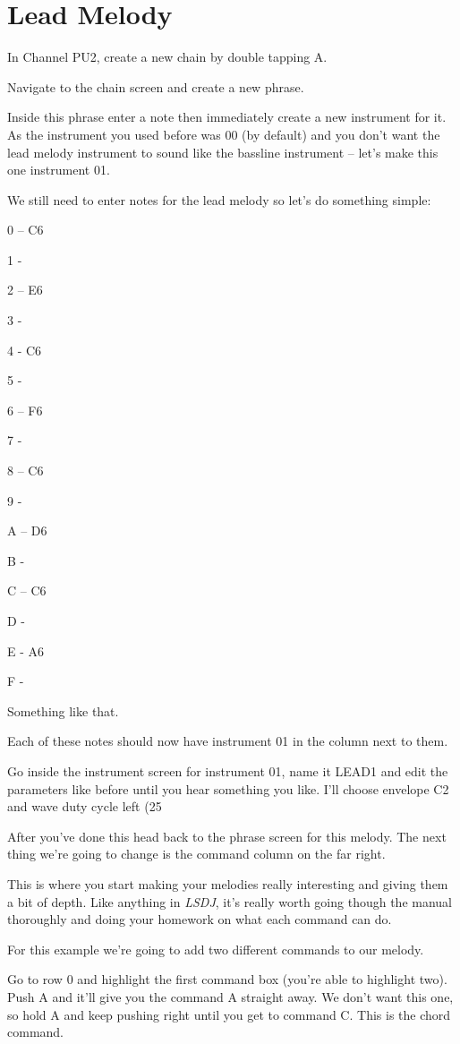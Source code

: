 \documentclass[]{article}
\newcommand{\lsdj}{\textit{LSDJ}\xspace}
\begin{document}
\section{Lead Melody}

In Channel PU2, create a new chain by double tapping A.

Navigate to the chain screen and create a new phrase.

Inside this phrase enter a note then immediately create a new instrument for it. As the instrument you used before was 00 (by default) and you don't want the lead melody instrument to sound like the bassline instrument – let's make this one instrument 01.

We still need to enter notes for the lead melody so let's do something simple:

0 – C6

1 -

2 – E6

3 -

4 - C6

5 -

6 – F6

7 -

8 – C6

9 -

A – D6

B -

C – C6

D -

E - A6

F -


Something like that.

Each of these notes should now have instrument 01 in the column next to them.

Go inside the instrument screen for instrument 01, name it LEAD1 and edit the parameters like before until you hear something you like. I'll choose envelope C2 and wave duty cycle left (25%

After you've done this head back to the phrase screen for this melody. The next thing we're going to change is the command column on the far right.

This is where you start making your melodies really interesting and giving them a bit of depth. Like anything in \lsdj, it's really worth going though the manual thoroughly and doing your homework on what each command can do.

For this example we're going to add two different commands to our melody.

Go to row 0 and highlight the first command box (you're able to highlight two). Push A and it'll give you the command A straight away. We don't want this one, so hold A and keep pushing right until you get to command C. This is the chord command.
\end{document}
